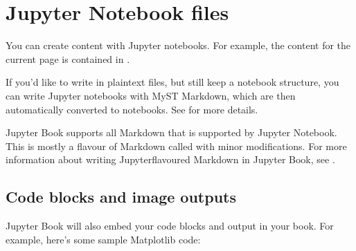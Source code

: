 \documentclass[letterpaper,10pt,english]{jupyterBook}
\begin{document}
\section{Jupyter Notebook files}
\label{\detokenize{content/1_modeling/notebooks:jupyter-notebook-files}}\label{\detokenize{content/1_modeling/notebooks:file-types-notebooks}}\label{\detokenize{content/1_modeling/notebooks::doc}}
\sphinxAtStartPar
You can create content with Jupyter notebooks.
For example, the content for the current page is contained in .

\begin{sphinxShadowBox}
\sphinxstylesidebartitle{}

\sphinxAtStartPar
If you’d like to write in plain\sphinxhyphen{}text files, but still keep a notebook structure, you can write
Jupyter notebooks with MyST Markdown, which are then automatically converted to notebooks.
See  for more details.
\end{sphinxShadowBox}

\sphinxAtStartPar
Jupyter Book supports all Markdown that is supported by Jupyter Notebook.
This is mostly a flavour of Markdown called  with minor modifications.
For more information about writing Jupyter\sphinxhyphen{}flavoured Markdown in Jupyter Book, see .


\subsection{Code blocks and image outputs}
\label{\detokenize{content/1_modeling/notebooks:code-blocks-and-image-outputs}}
\sphinxAtStartPar
Jupyter Book will also embed your code blocks and output in your book.
For example, here’s some sample Matplotlib code:
\end{document}

